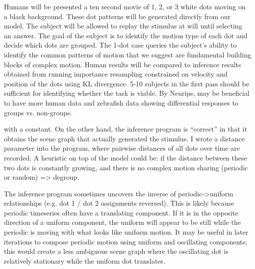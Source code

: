 \documentclass{scrartcl}
\begin{document}
Humans will be presented a ten second movie of 1, 2, or 3 white dots moving on a black background. These dot patterns will be generated directly from our model. The subject will be allowed to replay the stimulus at will until selecting an answer. The goal of the subject is to identify the motion type of each dot and decide which dots are grouped. The 1-dot case queries the subject's ability to identify the common patterns of motion that we suggest are fundamental building blocks of complex motion. Human results will be compared to inference results obtained from running importance resampling constrained on velocity and position of the dots using KL divergence. 5-10 subjects in the first pass should be sufficient for identifying whether the task is viable. By Neurips, may be beneficial to have more human data and zebrafish data showing differential responses to groups vs. non-groups. 

with a constant. On the other hand, the inference program is ``correct'' in that it obtains the scene graph that actually generated the stimulus. I wrote a distance parameter into the program, where pairwise distances of all dots over time are recorded. A heuristic on top of the model could be: if the distance between these two dots is constantly growing, and there is no complex motion sharing (periodic or random) => degroup. 

The inference program sometimes uncovers the inverse of periodic->uniform relationships (e.g. dot 1 / dot 2 assignments reversed). This is likely because periodic timeseries often have a translating component. If it is in the opposite direction of a uniform component, the uniform will appear to be still while the periodic is moving with what looks like uniform motion. It may be useful in later iterations to compose periodic motion using uniform and oscillating components; this would create a less ambiguous scene graph where the oscillating dot is relatively stationary while the uniform dot translates. 
\end{document}
